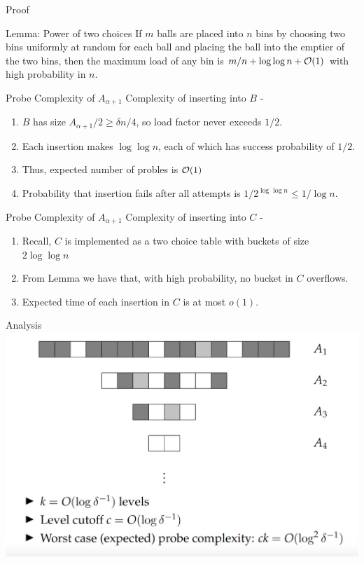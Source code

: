 \documentclass{beamer}
\begin{document}
\begin{frame}{Proof}
	\begin{block}{Lemma: Power of two choices}
		If $m$ balls are placed into $n$ bins by choosing two bins uniformly at random for each ball and placing the ball into the emptier of the two bins, then the maximum load of any bin is $m/n + \log{\log{n}} + {\cal O}(1)$ with high probability in $n$.
	\end{block}
\end{frame}



\begin{frame}{Probe Complexity of $A_{\alpha + 1}$}
	Complexity of inserting into $B$ - 
	\begin{enumerate}
		\item $B$ has size $A_{\alpha + 1}/2 \ge \delta n/4$, so load factor never exceeds $1/2$. 
		\item Each insertion makes $\log{\log{n}}$, each of which has success probability of $1/2$. 
		\item Thus, expected number of probles is ${\cal O}(1)$
		\item Probability that insertion fails after all attempts is $1/2^{\log{\log{n}}} \le 1/ \log{n}$.
	\end{enumerate}
\end{frame}

\begin{frame}{Probe Complexity of $A_{\alpha + 1}$}
	Complexity of inserting into $C$ - 
	\begin{enumerate}
		\item Recall, $C$ is implemented as a two choice table with buckets of size $2\log{\log{n}}$
		\item From Lemma we have that, with high probability, no bucket in $C$ overflows. 
		\item Expected time of each insertion in $C$ is at most $o(1)$.
	\end{enumerate}
\end{frame}

\begin{frame}{Analysis}
	\includegraphics[scale=0.3]{analysis}
\end{frame}
\end{document}
